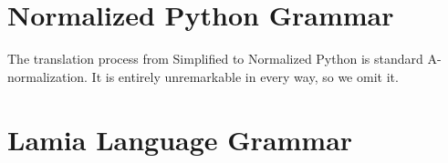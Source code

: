 \documentclass{article}
\begin{document}
\section{Normalized Python Grammar}
\begin{grammar}
  \grule[variables]{\pvariable}{}
  \grule[suites]{\psuite}{\gtobrk \pstmt; \ldots \gtcbrk}
  \grule[statements]{\pstmt}{
              \gtreturn \pvariable \gline
      \gor    \pvariable \gteq \pexpr \gline
      \gor    \gtwhile \pvariable \gtcolon \psuite \gtelse \gtcolon \psuite \gline
      \gor    \gtif \pvariable \gtcolon \psuite \gtelse \gtcolon \psuite \gline
      \gor    \gtraise \pvariable \gline
      \gor    \gttry \gtcolon \psuite \gtexcept \pvariable \gtcolon \psuite \gtelse \gtcolon \psuite \gline
      \gor    \gtpass \gline
      \gor    \gtbreak \gline
      \gor    \gtcontinue \gline
  }
  \grule[numbers]{\pnum}{}
\end{grammar}

The translation process from Simplified to Normalized Python is standard A-normalization.
It is entirely unremarkable in every way, so we omit it.

\section{Lamia Language Grammar}
\end{document}
